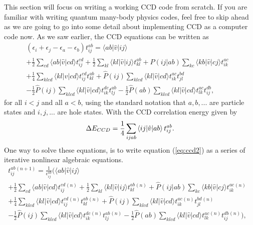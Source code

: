 This section will focus on writing a working CCD code from scratch. If you are familiar with writing quantum many-body physics codes, feel free to skip ahead as we are going to go into some detail about implementing CCD as a computer code now. As we saw earlier, the CCD equations can be written as 
\begin{align}
\left(\epsilon_i+\epsilon_j-\epsilon_a-\epsilon_b\right)t_{ij}^{ab} = \langle ab \vert \hat{v} \vert ij \rangle  & \nonumber \\ 
+\frac{1}{2}\sum_{cd} \langle ab \vert \hat{v} \vert cd \rangle t_{ij}^{cd}+\frac{1}{2}\sum_{kl} \langle kl \vert \hat{v} \vert ij \rangle t_{kl}^{ab}+\hat{P}(ij\vert ab)\sum_{kc} \langle kb \vert \hat{v} \vert cj \rangle t_{ik}^{ac} & \nonumber \\
+\frac{1}{4}\sum_{klcd} \langle kl \vert \hat{v} \vert cd \rangle t_{ij}^{cd}t_{kl}^{ab}+\hat{P}(ij)\sum_{klcd} \langle kl \vert \hat{v} \vert cd \rangle t_{ik}^{ac}t_{jl}^{bd}& \nonumber \\
-\frac{1}{2}\hat{P}(ij)\sum_{klcd} \langle kl \vert \hat{v} \vert cd \rangle t_{ik}^{dc}t_{lj}^{ab}-\frac{1}{2}\hat{P}(ab)\sum_{klcd} \langle kl \vert \hat{v} \vert cd \rangle t_{lk}^{ac}t_{ij}^{db},&
\label{eq:ccd2}
\end{align}
for all $i < j$ and all $a < b$, using the standard notation that $a,b,...$ are particle states and $i,j,...$ are hole states. With the CCD correlation energy given by
\begin{equation}
\Delta E_{CCD} = \frac{1}{4} \sum_{ijab} \braket{ij|\hat{v}|ab}t^{ab}_{ij}.
\label{eq:ccdcorr}
\end{equation}
One way to solve these equations, is to write equation (\ref{eq:ccd2}) as a series of iterative nonlinear algebraic equations.
\begin{align}
t_{ij}^{ab}{}^{(n+1)} = \frac{1}{\epsilon^{ab}_{ij}} \bigg(\langle ab \vert \hat{v} \vert ij \rangle  & \nonumber \\ 
+\frac{1}{2}\sum_{cd} \langle ab \vert \hat{v} \vert cd \rangle t_{ij}^{cd}{}^{(n)}+\frac{1}{2}\sum_{kl} \langle kl \vert \hat{v} \vert ij \rangle t_{kl}^{ab}{}^{(n)}+\hat{P}(ij\vert ab)\sum_{kc} \langle kb \vert \hat{v} \vert cj \rangle t_{ik}^{ac}{}^{(n)} & \nonumber \\
+\frac{1}{4}\sum_{klcd} \langle kl \vert \hat{v} \vert cd \rangle t_{ij}^{cd}{}^{(n)}t_{kl}^{ab}{}^{(n)}+\hat{P}(ij)\sum_{klcd} \langle kl \vert \hat{v} \vert cd \rangle t_{ik}^{ac}{}^{(n)}t_{jl}^{bd}{}^{(n)}& \nonumber \\
-\frac{1}{2}\hat{P}(ij)\sum_{klcd} \langle kl \vert \hat{v} \vert cd \rangle t_{ik}^{dc}{}^{(n)}t_{lj}^{ab}{}^{(n)}-\frac{1}{2}\hat{P}(ab)\sum_{klcd} \langle kl \vert \hat{v} \vert cd \rangle t_{lk}^{ac}{}^{(n)}t_{ij}^{db}{}^{(n)} \bigg),&
\label{eq:ccd3}
\end{align}
